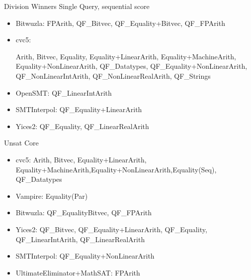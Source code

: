 \documentclass[table]{beamer}
\def\emph#1{\textcolor{MYblue}{#1}}
\begin{document}
\begin{frame}{Division Winners}
  \pause
  \emph{Single Query, sequential score}
  \begin{itemize}
  \item \emph{Bitwuzla}: {\small FPArith, QF\_Bitvec, QF\_Equality+Bitvec, QF\_FPArith}

  \item \emph{cvc5}: \begin{minipage}{.8\textwidth}\raggedright \tiny Arith,
    Bitvec, Equality, Equality+LinearArith, Equality+MachineArith,
    Equality+NonLinearArith, QF\_Datatypes, QF\_Equality+NonLinearArith, QF\_NonLinearIntArith, QF\_NonLinearRealArith, QF\_Strings\end{minipage}

  \item \emph{OpenSMT}: {\small QF\_LinearIntArith}

  \item \emph{SMTInterpol}: {\small QF\_Equality+LinearArith}

  \item \emph{Yices2}: {\small QF\_Equality, QF\_LinearRealArith}
  \end{itemize}

  \medskip

  \pause
  \emph{Unsat Core}
  \begin{itemize}
\item \emph{cvc5}: Arith, Bitvec, Equality+LinearArith, Equality+MachineArith,Equality+NonLinearArith,Equality(Seq), QF\_Datatypes
\item \emph{Vampire}: Equality(Par)
\item \emph{Bitwuzla}: QF\_EqualityBitvec, QF\_FPArith
\item \emph{Yices2}: QF\_Bitvec, QF\_Equality+LinearArith, QF\_Equality, QF\_LinearIntArith, QF\_LinearRealArith
\item \emph{SMTInterpol}: QF\_Equality+NonLinearArith
\item \emph{UltimateEliminator+MathSAT}: FPArith

  \end{itemize}

\end{frame}
\end{document}
